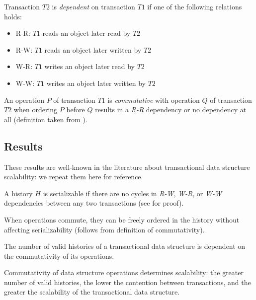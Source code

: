 \begin{defn}
    Transaction $T2$ is \emph{dependent} on transaction $T1$ if one of the following relations holds:
    \begin{itemize}
        \item R-R: $T1$ reads an object later read by $T2$
        \item R-W: $T1$ reads an object later written by $T2$
        \item W-R: $T1$ writes an object later read by $T2$
        \item W-W: $T1$ writes an object later written by $T2$
    \end{itemize}
\end{defn}

\begin{defn}
    An operation $P$ of transaction $T1$ is \emph{commutative} with operation $Q$ of transaction $T2$ when ordering $P$ before $Q$ results in a \emph{R-R} dependency or no dependency at all (definition taken from \cite{weihl}).
\end{defn}

\subsection{Results}

These results are well-known in the literature about transactional data structure scalability: we repeat them here for reference.
\begin{theorem}
    A history $H$ is serializable if there are no cycles in \emph{R-W}, \emph{W-R}, or \emph{W-W} dependencies between any two transactions (see \cite{schwarz} for proof).
\end{theorem}

\begin{theorem}
    When operations commute, they can be freely ordered in the history without affecting serializability (follows from definition of commutativity).
\end{theorem}

\begin{corollary}
    The number of valid histories of a transactional data structure is dependent on the commutativity of its operations.
\end{corollary}

\begin{corollary}
    Commutativity of data structure operations determines scalability: the greater number of valid histories, the lower the contention between transactions, and the greater the scalability of the transactional data structure. 
\end{corollary}

